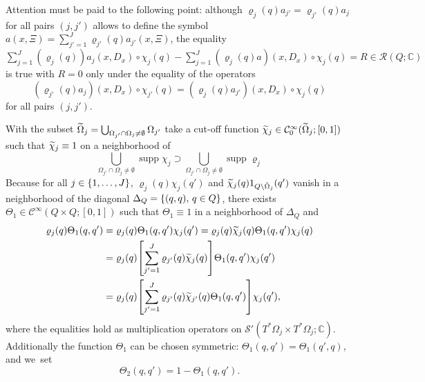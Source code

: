 \documentclass[AHL,Unicode,longabstracts]{cedram}
\newcommand{\C}{\mathbb{C}}
\newcommand{\clC}{\mathcal{C}}
\newcommand{\clS}{\mathcal{S}}
\newcommand{\clR}{\mathcal{R}}
\DeclareMathOperator{\suppp}{supp}
\let\oldtilde\tilde
\renewcommand*{\tilde}[1]{\mathchoice{\widetilde{#1}}{\widetilde{#1}}{\oldtilde{#1}}{\oldtilde{#1}}}
\let\originalleft\left
\let\originalright\right
\renewcommand{\left}{\mathopen{}\mathclose\bgroup\originalleft}
\renewcommand{\right}{\aftergroup\egroup\originalright}
\begin{document}
Attention must be paid to the following point: although $\varrho_{j}(q)a_{j'}=\varrho_{j'}(q)a_{j}$ for all pairs $(j,j')$ allows to define the symbol $a(x,\Xi)=\sum_{j'=1}^{J}\varrho_{j'}(q)a_{j'}(x,\Xi)$, the equality $\sum_{j=1}^{J}(\varrho_{j}(q))a_{j}(x,D_{x})\circ\chi_{j}(q)-\sum_{j=1}^{J}(\varrho_{j}(q)a)(x,D_{x})\circ\chi_{j}(q)=R\in \clR(Q;\C)$ is true with $R=0$ only under the equality of the operators
\[
(\varrho_{j'}(q)a_{j})(x,D_{x})\circ\chi_{j'}(q)=(\varrho_{j}(q)a_{j'})(x,D_{x})\circ\chi_{j}(q)
\]
for all pairs $(j,j')$.

With the subset $\tilde{\Omega}_{j}=\bigcup_{\Omega_{j'}\cap \Omega_{j}\neq\emptyset}\Omega_{j'}$ take a cut-off function $\tilde{\chi}_{j}\in \clC^{\infty}_{0}(\tilde{\Omega}_{j};[0,1])$ such that $\tilde{\chi}_{j}\equiv 1$ on a neighborhood of
\[
\bigcup_{\Omega_{j'}\cap \Omega_{j}\neq \emptyset}\suppp\chi_{j}
\supset
\bigcup_{\Omega_{j'}\cap \Omega_{j}\neq \emptyset}\suppp\varrho_{j}
\]
Because for all $j\in \left\{1,\dots,J\right\}$, $\varrho_{j}(q)\chi_{j}(q')$ and $\tilde{\chi}_{j}(q)1_{Q\setminus\tilde{\Omega}_{j}}(q')$ vanish in a neighborhood of the diagonal $\Delta_{Q}=\left\{(q,q),\, q\in Q\right\}$, there exists $\Theta_{1}\in \clC^{\infty}(Q\times Q;[0,1])$ such that $\Theta_{1}\equiv 1$ in a neighborhood of $\Delta_{Q}$ and
\begin{equation}
\begin{aligned}[t]
\varrho_{j}(q)\Theta_{1}(q,q')&=\varrho_{j}(q)\Theta_{1}(q,q')\chi_{j}(q')=\varrho_{j}(q)\tilde{\chi}_{j}(q)\Theta_{1}(q,q')\chi_{j}(q)\\
 &=\varrho_{j}(q)\left[\sum_{j'=1}^{J}\varrho_{j'}(q)\tilde{\chi}_{j}(q)\right]\Theta_{1}(q,q')\chi_{j}(q')\\\label{eq:rhojchij}
&=\varrho_{j}(q)\left[\sum_{j'=1}^{J}\varrho_{j'}(q)\tilde{\chi}_{j'}(q)\Theta_{1}(q,q')\right]\chi_{j}(q'),
\end{aligned}
\end{equation}
where the equalities hold as multiplication operators on $\clS'(T^{*}\Omega_{j}\times T^{*}\Omega_{j};\C)$. Additionally the function $\Theta_{1}$ can be chosen symmetric: $\Theta_{1}(q,q')=\Theta_{1}(q',q)$, and we~set
\[
\Theta_2(q,q') = 1-\Theta_1(q,q').
\]
\end{document}
